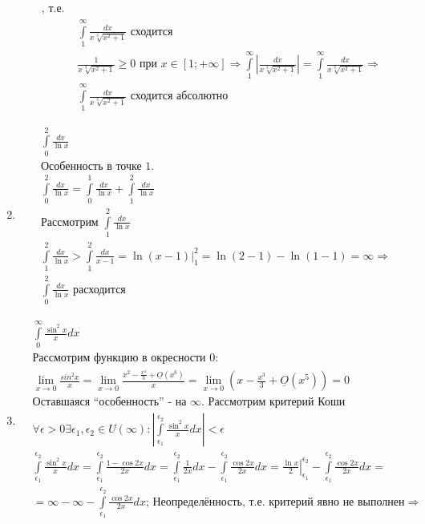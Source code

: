 \documentclass[a4paper, 12pt]{article}
\begin{document}
\begin{enumerate}
\begin{align*}
 \text{, т.е. } \\
 &\int\limits_1^\infty \frac{dx}{x\sqrt[3]{x^2+1}} \text{ сходится} \\
 &\frac{1}{x\sqrt[3]{x^2+1}} \geq0 \text{ при }x\in[1;+\infty] \Rightarrow
 \int\limits_1^\infty \left|\frac{dx}{x\sqrt[3]{x^2+1}}\right| = 
 \int\limits_1^\infty \frac{dx}{x\sqrt[3]{x^2+1}} \Rightarrow \\
 &\int\limits_1^\infty \frac{dx}{x\sqrt[3]{x^2+1}} \text{ сходится абсолютно}
\end{align*}
\item %
\begin{align*}
 &\int\limits_0^2 \frac{dx}{\ln x} \\
 &\text{Особенность в точке 1.} \\
 &\int\limits_0^2 \frac{dx}{\ln x} = \int\limits_0^1 \frac{dx}{\ln x} +
 \int\limits_1^2 \frac{dx}{\ln x} \\
 &\text{Рассмотрим } \int\limits_1^2 \frac{dx}{\ln x} \\
 &\int\limits_1^2 \frac{dx}{\ln x} > \int\limits_1^2 \frac{dx}{x-1} = 
 \ln(x-1)\Big|_1^2 = \ln(2-1) - \ln(1-1) = \infty \Rightarrow \\
 &\int\limits_0^2 \frac{dx}{\ln x} \text{ расходится}
\end{align*}
\item %
\begin{align*}
 &\int\limits_0^\infty \frac{\sin^2x}{x}dx \\
 &\text{Рассмотрим функцию в окресности 0: } \\
 &\lim_{x\to0}\frac{sin^2 x}{x} = \lim_{x\to0}\frac{x^2 - \frac{x^4}{3}+\underline{O}(x^6)}{x} = \lim_{x\to0}\left(x-\frac{x^3}{3}+\underline{O}(x^5)\right) = 0 \\
 &\text{Оставшаяся ``особенность'' - на $\infty$. Рассмотрим критерий Коши} \\
 &\forall\epsilon>0 \exists \epsilon_1,\epsilon_2 \in U(\infty):
  \left|\int\limits_{\epsilon_1}^{\epsilon_2} \frac{\sin^2x}{x}dx\right| < \epsilon \\
 &\int\limits_{\epsilon_1}^{\epsilon_2} \frac{\sin^2x}{x}dx = 
 \int\limits_{\epsilon_1}^{\epsilon_2} \frac{1-\cos 2x}{2x}dx = 
 \int\limits_{\epsilon_1}^{\epsilon_2} \frac{1}{2x}dx - 
 \int\limits_{\epsilon_1}^{\epsilon_2} \frac{\cos2x}{2x}dx = 
 \left.\frac{\ln x}{2}\right|_{\epsilon_1}^{\epsilon_2} - 
 \int\limits_{\epsilon_1}^{\epsilon_2} \frac{\cos2x}{2x}dx = \\
 &=\infty - \infty -
 \int\limits_{\epsilon_1}^{\epsilon_2} \frac{\cos2x}{2x}dx \text{; Неопределённость, т.е. критерий явно не выполнен} \Rightarrow \\

\end{align*}
\end{enumerate}
\end{document}
